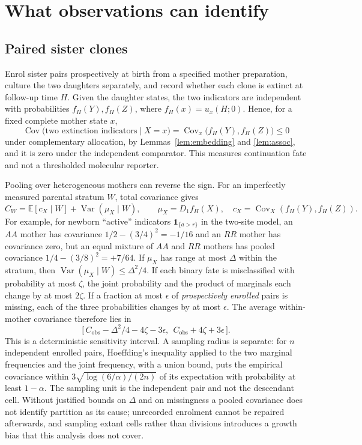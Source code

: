 \documentclass[11pt]{article}
\theoremstyle{remark}
\newcommand{\one}{\mathbf 1}
\newcommand{\E}{\mathbb E}
\newcommand{\Cov}{\operatorname{Cov}}
\newcommand{\Var}{\operatorname{Var}}
\begin{document}
\section{What observations can identify}\label{sec:observation}

\subsection{Paired sister clones}
Enrol sister pairs prospectively at birth from a specified mother
preparation, culture the two daughters separately, and record whether each
clone is extinct at follow-up time $H$. Given the daughter states, the two
indicators are independent with probabilities $f_H(Y),f_H(Z)$, where
$f_H(x)=u_x(H;0)$. Hence, for a fixed complete mother state $x$,
\[
 \Cov\bigl(\text{two extinction indicators}\mid X=x\bigr)=\Cov_x\bigl(f_H(Y),f_H(Z)\bigr)\le0
\]
under complementary allocation, by Lemmas~\ref{lem:embedding} and
\ref{lem:assoc}, and it is zero under the independent comparator. This
measures continuation fate and not a thresholded molecular reporter.

Pooling over heterogeneous mothers can reverse the sign. For an imperfectly
measured parental stratum $W$, total covariance gives
\[
 C_W=\E[c_X\mid W]+\Var(\mu_X\mid W),\qquad\mu_X=D_1f_H(X),\quad c_X=\Cov_X(f_H(Y),f_H(Z)).
\]
For example, for newborn ``active'' indicators $\one_{\{a>r\}}$ in the
two-site model, an $AA$ mother has covariance $1/2-(3/4)^2=-1/16$ and an $RR$
mother has covariance zero, but an equal mixture of $AA$ and $RR$ mothers has
pooled covariance $1/4-(3/8)^2=+7/64$. If $\mu_X$ has range at most $\Delta$
within the stratum, then $\Var(\mu_X\mid W)\le\Delta^2/4$. If each binary fate
is misclassified with probability at most $\zeta$, the joint probability and
the product of marginals each change by at most $2\zeta$. If a fraction at
most $\epsilon$ of \emph{prospectively enrolled} pairs is missing, each of the
three probabilities changes by at most $\epsilon$. The average within-mother
covariance therefore lies in
\begin{equation}\label{eq:observation}
 \bigl[\,C_{\mathrm{obs}}-\Delta^2/4-4\zeta-3\epsilon,\ \ C_{\mathrm{obs}}+4\zeta+3\epsilon\,\bigr].
\end{equation}
This is a deterministic sensitivity interval. A sampling radius is separate:
for $n$ independent enrolled pairs, Hoeffding's inequality
\cite{hoeffding1963} applied to the two marginal frequencies and the joint
frequency, with a union bound, puts the empirical covariance within
$3\sqrt{\log(6/\alpha)/(2n)}$ of its expectation with probability at least
$1-\alpha$. The sampling unit is the independent pair and not the descendant
cell. Without justified bounds on $\Delta$ and on missingness a pooled
covariance does not identify partition as its cause; unrecorded enrolment
cannot be repaired afterwards, and sampling extant cells rather than
divisions introduces a growth bias that this analysis does not cover.
\end{document}
